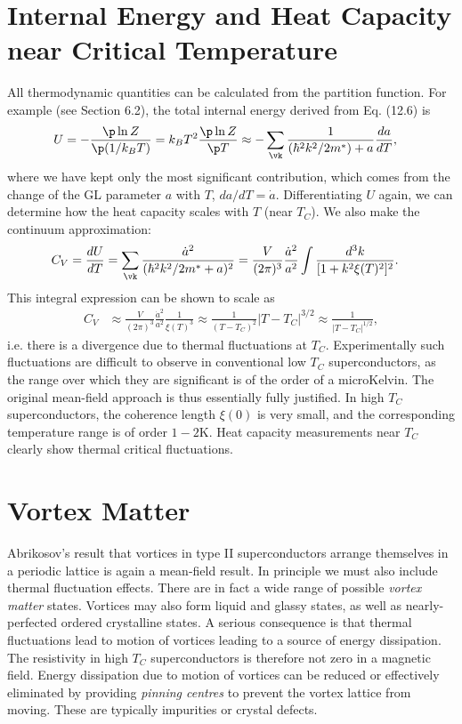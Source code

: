 \documentclass[qo.tex]{subfiles}
\begin{document}
\section{Internal Energy and Heat Capacity near Critical Temperature}
All thermodynamic quantities can be calculated from the partition function. 
For example (see Section 6.2), the total internal energy derived from Eq. (12.6) is
\begin{align}
    U &= -\frac{\p\ln Z}{\p(1/k_BT)} = k_BT^2\frac{\p\ln Z}{\p T} \approx -\sum_{\vk} \frac{1}{(\hbar^2k^2/2m^*)+a}\frac{da}{dT},
\end{align}
where we have kept only the most significant contribution, which comes from the change of the GL parameter $a$ with $T$, $da/dT=\dot{a}$.
Differentiating $U$ again, we can determine how the heat capacity scales with $T$ (near $T_C$).
We also make the continuum approximation:
\begin{align}
    C_V &= \frac{dU}{dT} = \sum_{\vk}\frac{\dot{a}^2}{(\hbar^2k^2/2m^* + a)^2} = \frac{V}{(2\pi)^3}\frac{\dot{a}^2}{a^2}\int \frac{d^3k}{[1+k^2\xi(T)^2]^2}.
\end{align}
This integral expression can be shown to scale as
\begin{align}
    C_V &\approx \frac{V}{(2\pi)^3}\frac{\dot{a}^2}{a^2}\frac{1}{\xi(T)^3} \approx \frac{1}{(T-T_C)^2}|T-T_C|^{3/2} \approx \frac{1}{|T-T_C|^{1/2}},
\end{align}
i.e. there is a divergence due to thermal fluctuations at $T_C$.
Experimentally such fluctuations are difficult to observe in conventional low $T_C$ superconductors, as the range over which they are significant is of the order of a microKelvin. 
The original mean-field approach is thus essentially fully justified. 
In high $T_C$ superconductors, the coherence length $\xi(0)$ is very small, and the corresponding temperature range is of order $1-2$K.
Heat capacity measurements near $T_C$ clearly show thermal critical fluctuations.

\section{Vortex Matter}
Abrikosov's result that vortices in type II superconductors arrange themselves in a periodic lattice is again a mean-field result. 
In principle we must also include thermal fluctuation effects. 
There are in fact a wide range of possible \emph{vortex matter} states.
Vortices may also form liquid and glassy states, as well as nearly-perfected ordered crystalline states.
A serious consequence is that thermal fluctuations lead to motion of vortices leading to a source of energy dissipation. 
The resistivity in high $T_C$ superconductors is therefore not zero in a magnetic field. 
Energy dissipation due to motion of vortices can be reduced or effectively eliminated by providing \emph{pinning centres} to prevent the vortex lattice from moving. 
These are typically impurities or crystal defects.
\end{document}

